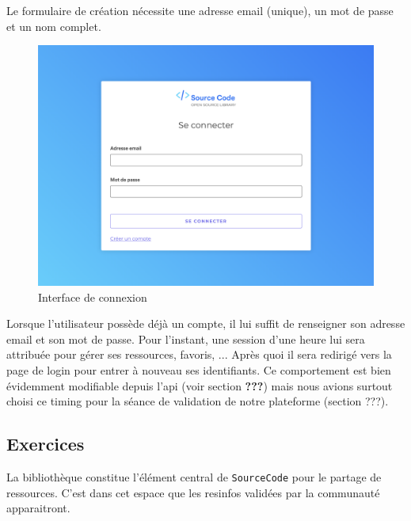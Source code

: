 Le formulaire de création nécessite une adresse email (unique), un mot de passe et un nom complet.


\begin{figure}[H]
    \includegraphics[width=\textwidth,height=0.35\textheight,keepaspectratio]{images/client/login.png}
    \centering
    \caption[SourceCode : interface de connexion]{Interface de connexion}
\end{figure}

Lorsque l'utilisateur possède déjà un compte, il lui suffit de renseigner son adresse email et son mot de passe. Pour l'instant, une session d'une heure lui sera attribuée pour gérer ses ressources, favoris, ... Après quoi il sera redirigé vers la page de login pour entrer à nouveau ses identifiants. Ce comportement est bien évidemment modifiable depuis l'api (voir section \textbf{???}) mais nous avions surtout choisi ce timing pour la séance de validation de notre plateforme (section ???).\\


\subsection{Exercices}

La bibliothèque constitue l'élément central de \texttt{SourceCode} pour le partage de ressources. C'est dans cet espace que les \glspl{resinfo} validées par la communauté apparaitront.\\

